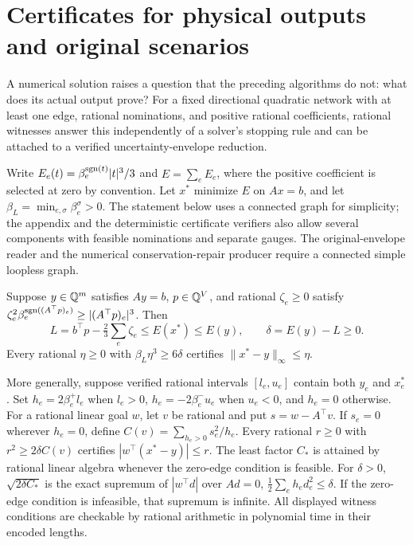 \section{Certificates for physical outputs and original scenarios}
\label{sec:main-certificates}

A numerical solution raises a question that the preceding algorithms do
not: what does its actual output prove? For a fixed directional
quadratic network with at least one edge, rational nominations, and
positive rational coefficients, rational witnesses answer this
independently of a solver's stopping rule and can be attached to a
verified uncertainty-envelope reduction.

Write
$E_e(t)=\beta_e^{\operatorname{sgn}(t)}|t|^3/3$ and $E=\sum_eE_e$,
where the positive coefficient is selected at zero by convention.
Let $x^*$ minimize $E$ on $Ax=b$, and let
$\beta_L=\min_{e,\sigma}\beta_e^\sigma>0$.
The statement below uses a connected graph for simplicity; the
appendix and the deterministic certificate verifiers also allow several
components with feasible nominations and separate gauges. The
original-envelope reader and the numerical conservation-repair producer
require a connected simple loopless graph.

\begin{theorem}
\label{thm:main-certificates}
Suppose $y\in\mathbb{Q}^m$ satisfies $Ay=b$, $p\in\mathbb{Q}^V$, and rational
$\zeta_e\ge0$ satisfy
$\zeta_e^2\beta_e^{\operatorname{sgn}((A^\top p)_e)}\ge|(A^\top p)_e|^3$.
Then
\[
 L=b^\top p-\tfrac23\sum_e\zeta_e\le E(x^*)\le E(y),
 \qquad \delta=E(y)-L\ge0.
\]
Every rational $\eta\ge0$ with $\beta_L\eta^3\ge6\delta$
certifies $\|x^*-y\|_\infty\le\eta$.

More generally, suppose verified rational intervals $[l_e,u_e]$
contain both $y_e$ and $x_e^*$. Set $h_e=2\beta_e^+l_e$ when
$l_e>0$, $h_e=-2\beta_e^-u_e$ when $u_e<0$, and $h_e=0$ otherwise.
For a rational linear goal $w$, let $v$ be rational and put
$s=w-A^\top v$. If $s_e=0$ wherever $h_e=0$, define
$C(v)=\sum_{h_e>0}s_e^2/h_e$. Every rational $r\ge0$ with
$r^2\ge2\delta C(v)$ certifies
$|w^\top(x^*-y)|\le r$.
The least factor $C_*$ is attained by rational linear algebra whenever
the zero-edge condition is feasible. For $\delta>0$,
$\sqrt{2\delta C_*}$ is the exact supremum of $|w^\top d|$ over
$Ad=0$, $\tfrac12\sum_e h_ed_e^2\le\delta$. If the zero-edge
condition is infeasible, that supremum is infinite. All displayed
witness conditions are checkable by rational arithmetic in polynomial
time in their encoded lengths.
\end{theorem}

